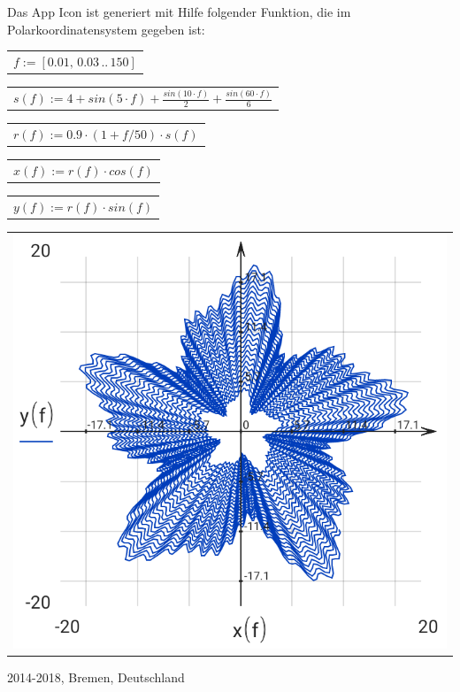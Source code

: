 \documentclass[DIV=calc, paper=a4, fontsize=11pt, twocolumn]{scrartcl}
\begin{document}
Das App Icon ist generiert mit Hilfe
folgender Funktion, die im
Polarkoordinatensystem gegeben ist:
\begin{center}\begin{tabular}{c}
  $f := \left[ 0.01,\, 0.03 \,..\, 150 \right]$
\end{tabular}\end{center}
\begin{center}\begin{tabular}{c}
  $s(f) := 4 + sin \left( 5 \cdot f\right)  + \frac{sin \left( 10 \cdot f\right) }{2} + \frac{sin \left( 60 \cdot f\right) }{6}$
\end{tabular}\end{center}
\begin{center}\begin{tabular}{c}
  $r(f) := 0.9 \cdot \left( 1 + f / 50 \right) \cdot s \left( f\right) $
\end{tabular}\end{center}
\begin{center}\begin{tabular}{c}
  $x(f) := r \left( f\right)  \cdot cos \left( f\right) $
\end{tabular}\end{center}
\begin{center}\begin{tabular}{c}
  $y(f) := r \left( f\right)  \cdot sin \left( f\right) $
\end{tabular}\end{center}
\begin{center}\begin{tabular}{c} \includegraphics[resolution=320]{graphics/about_micromath_fig1.png} \end{tabular}\end{center}

2014-2018, Bremen, Deutschland
\end{document}
